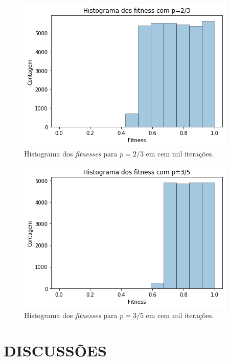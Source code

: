\documentclass[10pt,brazil,english]{article}
\begin{document}
            \begin{figure}[!hbtp]
                \begin{center}
                    \includegraphics[scale=0.5]{Images/5-2-1.png}
                \end{center}
                \caption{Histograma dos \textit{fitnesses} para $p = 2/3$ em cem mil iterações.}
                \label{Fig2}
            \end{figure}

            \begin{figure}[!hbtp]
                \begin{center}
                    \includegraphics[scale=0.5]{Images/5-2-2.png}
                \end{center}
                \caption{Histograma dos \textit{fitnesses} para $p = 3/5$ em cem mil iterações.}
                \label{Fig3}
            \end{figure}            

    \section{DISCUSSÕES}
\end{document}
